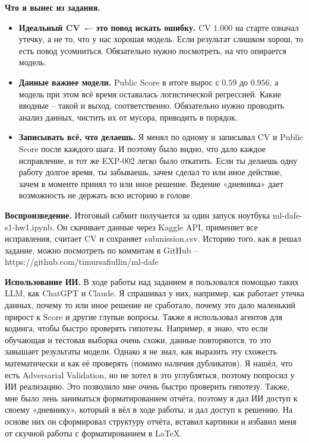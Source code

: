 \documentclass[11pt,a4paper,twocolumn]{article}
\newcommand{\f}[1]{{\ttfamily\def\_{\textunderscore\allowbreak}#1}}
\begin{document}
\textbf{Что я вынес из задания.}
\begin{itemize}
    \item \textbf{Идеальный CV~-– это повод искать ошибку.} CV $1.000$ на старте означал утечку, а не то, что у нас хорошая модель. Если результат слишком хорош, то есть повод усомниться. Обязательно нужно посмотреть, на что опирается модель.
    \item \textbf{Данные важнее модели.} Public Score в итоге вырос с $0.59$ до $0.956$, а модель при этом всё время оставалась логистической регрессией. Какие вводные – такой и выход, соответственно. Обязательно нужно проводить анализ данных, чистить их от мусора, приводить в порядок.
    \item \textbf{Записывать всё, что делаешь.} Я менял по одному и записывал CV и Public Score после каждого шага. И поэтому было видно, что дало каждое исправление, и тот же EXP-002 легко было откатить. Если ты делаешь одну работу долгое время, ты забываешь, зачем сделал то или иное действие, зачем в моменте принял то или иное решение. Ведение «дневника» дает возможность не держать всю историю в голове.
\end{itemize}

\medskip
\textbf{Воспроизведение.} Итоговый сабмит получается за один запуск ноутбука \mbox{\f{ml-dafe-s1-hw1.ipynb}}. Он скачивает данные через Kaggle API, применяет все исправления, считает CV и сохраняет \f{submission.csv}. Историю того, как я решал задание, можно посмотреть по коммитам в GitHub – https://github.com/timursafiullin/ml-dafe

\medskip
\textbf{Использование ИИ.} В ходе работы над заданием я пользовался помощью таких LLM, как ChatGPT и Claude. Я спрашивал у них, например, как работает утечка данных, почему то или иное решение не сработало, почему это дало маленький прирост к Score и другие глупые вопросы. Также я использовал агентов для кодинга, чтобы быстро проверять гипотезы. Например, я знаю, что если обучающая и тестовая выборка очень схожи, данные повторяются, то это завышает результаты модели. Однако я не знал, как выразить эту схожесть математически и как её проверять (помимо наличия дубликатов). Я нашёл, что есть Adversarial Validation, но не хотел в это углубляться, поэтому попросил у ИИ реализацию. Это позволило мне очень быстро проверить гипотезу. Также, мне было лень заниматься форматированием отчёта, поэтому я дал ИИ доступ к своему «дневнику», который я вёл в ходе работы, и дал доступ к решению. На основе них он сформировал структуру отчёта, вставил картинки и избавил меня от скучной работы с форматированием в LaTeX.
\end{document}
